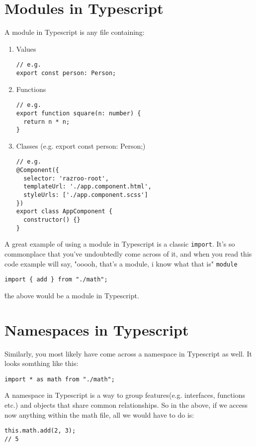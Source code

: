 \section{Modules in Typescript}
A module in Typescript is any file containing: 
\begin{enumerate}
  \item Values 
\begin{verbatim}
// e.g.  
export const person: Person;  
\end{verbatim}  
\item Functions
\begin{verbatim}
// e.g. 
export function square(n: number) {
  return n * n;
}
\end{verbatim}
\item Classes (e.g. export const person: Person;)
\begin{verbatim}
// e.g.
@Component({
  selector: 'razroo-root',
  templateUrl: './app.component.html',
  styleUrls: ['./app.component.scss']
})
export class AppComponent {
  constructor() {}
}
\end{verbatim}
\end{enumerate}

A great example of using a module in Typescript is a classic \lstinline{import}. It's so commonplace that you've undoubtedly come across of it, and when you read this code example will say, "ooooh, that's a module, i know what that is" \lstinline{module}
\begin{lstlisting}
import { add } from "./math";
\end{lstlisting}

\^ the above would be a module in Typescript.

\section{Namespaces in Typescript}
Similarly, you most likely have come across a namespace in Typescript as well. It looks somthing like this:
\begin{lstlisting}
import * as math from "./math";
\end{lstlisting}
A namespace in Typescript is a way to group features(e.g. interfaces, functions etc.) and objects that share common relationships. So in the above, if we access now anything within the math file, all we would have to do is:
\begin{verbatim}
this.math.add(2, 3);
// 5  
\end{verbatim}

